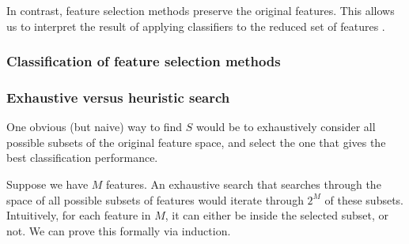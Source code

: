 \documentclass[12pt, twoside, a4paper]{article}
\begin{document}
In contrast, feature selection methods preserve the original features. This allows us to interpret the result of applying classifiers to the reduced set of features \cite{RefWorks:142}.

\subsubsection{Classification of feature selection methods}

\subsubsection{Exhaustive versus heuristic search}

One obvious (but naive) way to find $S$ would be to exhaustively consider all possible subsets of the original feature space, and select the one that gives the best classification performance.

Suppose we have $M$ features. An exhaustive search that searches through the space of all possible subsets of features would iterate through $2^M$ of these subsets. Intuitively, for each feature in $M$, it can either be inside the selected subset, or not. We can prove this formally via induction.
\end{document}
